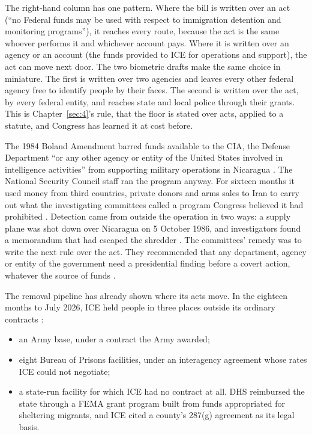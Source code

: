 The right-hand column has one pattern. Where the bill is written over an act (“no Federal funds may be used with respect to immigration detention and monitoring programs”), it reaches every route, because the act is the same whoever performs it and whichever account pays. Where it is written over an agency or an account (the funds provided to ICE for operations and support), the act can move next door. The two biometric drafts make the same choice in miniature. The first is written over two agencies and leaves every other federal agency free to identify people by their faces. The second is written over the act, by every federal entity, and reaches state and local police through their grants. This is Chapter~\ref{sec:4}'s rule, that the floor is stated over acts, applied to a statute, and Congress has learned it at cost before.

The 1984 Boland Amendment barred funds available to the CIA, the Defense Department “or any other agency or entity of the United States involved in intelligence activities” from supporting military operations in Nicaragua \autocite[§8066(a)]{boland1984}. The National Security Council staff ran the program anyway. For sixteen months it used money from third countries, private donors and arms sales to Iran to carry out what the investigating committees called a program Congress believed it had prohibited \autocite{irancontra1987}. Detection came from outside the operation in two ways: a supply plane was shot down over Nicaragua on 5 October 1986, and investigators found a memorandum that had escaped the shredder \autocite{irancontra1987}. The committees' remedy was to write the next rule over the act. They recommended that any department, agency or entity of the government need a presidential finding before a covert action, whatever the source of funds \autocite{irancontra1987}.

The removal pipeline has already shown where its acts move. In the eighteen months to July 2026, ICE held people in three places outside its ordinary contracts \autocite{gao2026detention}:

\begin{itemize}
\item an Army base, under a contract the Army awarded;
\item eight Bureau of Prisons facilities, under an interagency agreement whose rates ICE could not negotiate;
\item a state-run facility for which ICE had no contract at all. DHS reimbursed the state through a FEMA grant program built from funds appropriated for sheltering migrants, and ICE cited a county's 287(g) agreement as its legal basis.
\end{itemize}

